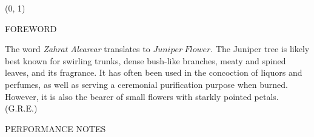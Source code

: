 \documentclass[11pt]{article}
\begin{document}
\begin{textblock}{23}(0, 1)
\begin{center}
\huge FOREWORD
\end{center}
\end{textblock}

\begingroup
\begin{center}
The word \textit{Zahrat Alearear} translates to $Juniper \ Flower$. The Juniper tree is likely best known for swirling trunks, dense bush-like branches, meaty and spined leaves, and its fragrance. It has often been used in the concoction of liquors and perfumes, as well as serving a ceremonial purification purpose when burned. However, it is also the bearer of small flowers with starkly pointed petals.
\rightskip\leftskip
\phantom{text} \hfill (G.R.E.)
\end{center}
\endgroup

\begin{center}
\huge PERFORMANCE NOTES
\end{center}
\end{document}
